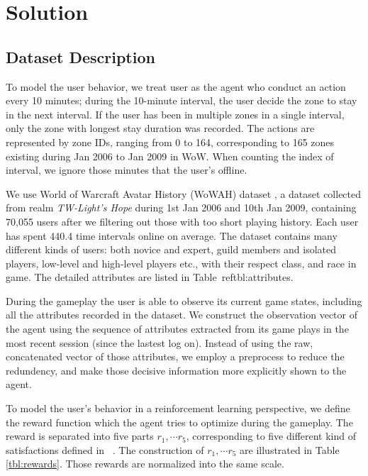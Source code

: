\documentclass[a4paper]{article}
\begin{document}
\section{Solution}

\subsection{Dataset Description}

To model the user behavior, we treat user as the agent who conduct an action every 10 minutes; during the 10-minute interval, the user decide the zone to stay in the next interval. If the user has been in multiple zones in a single interval, only the zone with longest stay duration was recorded. The actions are represented by zone IDs, ranging from 0 to 164, corresponding to 165 zones existing during Jan 2006 to Jan 2009 in WoW. When counting the index of interval, we ignore those minutes that the user's offline.

We use World of Warcraft Avatar History (WoWAH) dataset \cite{}, a dataset collected from realm \textit{TW-Light's Hope} during 1st Jan 2006 and 10th Jan 2009, containing 70,055 users after we filtering out those with too short playing history. Each user has spent 440.4 time intervals online on average. The dataset contains many different kinds of users: both novice and expert, guild members and isolated players, low-level and high-level players etc., with their respect class, and race in game. The detailed attributes are listed in Table~ref{tbl:attributes}.

During the gameplay the user is able to observe its current game states, including all the attributes recorded in the dataset. We construct the observation vector of the agent using the sequence of attributes extracted from its game plays in the most recent session (since the lastest log on). Instead of using the raw, concatenated vector of those attributes, we employ a preprocess to reduce the redundency, and make those decisive information more explicitly shown to the agent.

To model the user's behavior in a reinforcement learning perspective, we define the reward function which the agent tries to optimize during the gameplay. The reward is separated into five parts $r_1,\cdots r_5$, corresponding to five different kind of satisfactions defined in ~\cite{}. The construction of $r_1,\cdots r_5$ are illustrated in Table \ref{tbl:rewards}. Those rewards are normalized into the same scale.
\end{document}
